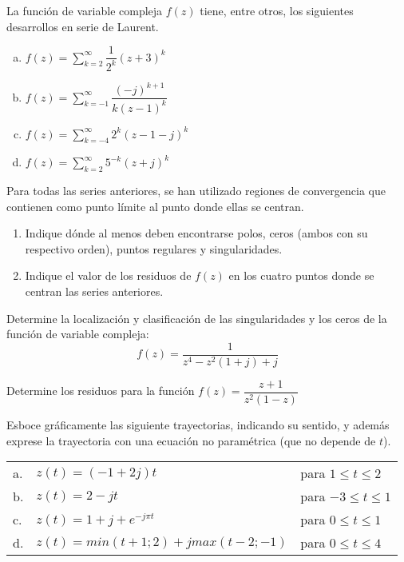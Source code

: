 \begin{ejercicio}
    La función de variable compleja $f(z)$ tiene, entre otros, los siguientes desarrollos en serie de Laurent.\par
    \begin{enumerate}[a.]
        \item $f(z)=\sum\limits_{k=2}^{\infty}\dfrac{1}{2^k}(z+3)^k$\\
        \item $f(z)=\sum\limits_{k=-1}^{\infty}\dfrac{(-j)^{k+1}}{k(z-1)^k}$\\
        \item $f(z)=\sum\limits_{k=-4}^{\infty}2^k(z-1-j)^k$\\
        \item $f(z)=\sum\limits_{k=2}^{\infty}5^{-k}(z+j)^k$
    \end{enumerate}
    Para todas las series anteriores, se han utilizado regiones de convergencia que contienen como punto límite al punto donde ellas se centran.

    \begin{enumerate}
        \item Indique dónde al menos deben encontrarse polos, ceros (ambos con su respectivo orden), puntos regulares y singularidades.
        \item Indique el valor de los residuos de $f(z)$ en los cuatro puntos donde se centran las series anteriores.
    \end{enumerate}
\end{ejercicio}

\begin{ejercicio}
    Determine la localización y clasificación de las singularidades y los ceros de la función de variable compleja:
    $$ f(z)=\dfrac{1}{z^4-z^2(1+j)+j} $$
\end{ejercicio}

\begin{ejercicio}
    Determine los residuos para la función $f(z)=\dfrac{z+1}{z^2(1-z)}$
\end{ejercicio}

\begin{ejercicio}
    Esboce gráficamente las siguiente trayectorias, indicando su sentido, y además exprese la trayectoria con una ecuación no paramétrica (que no depende de $t$).\par
    \hspace{3pt}
    \begin{tabular}{lll}
        a. & $z(t)=(-1+2j)t$ & para $1 \leq t \leq 2 $\\
        b. & $z(t)=2-jt$ & para  $-3 \leq t \leq 1$\\
        c. & $z(t)=1+j+e^{-j\pi t}$ & para $0 \leq t \leq 1$\\
        d. & $z(t)=min(t+1;2)+j max(t-2;-1)$ & para $0 \leq t \leq 4$
    \end{tabular}
\end{ejercicio}

